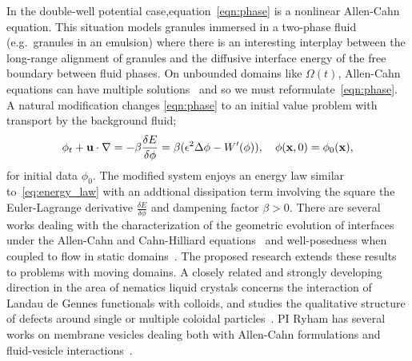 In the double-well potential case,equation~\eqref{eqn:phase} is a
nonlinear Allen-Cahn equation. This situation models granules immersed
in a two-phase fluid (e.g.~granules in an emulsion) where there is an
interesting interplay between the long-range alignment of granules and
the diffusive interface energy of the free boundary between fluid
phases. On unbounded domains like $\Omega(t)$, Allen-Cahn equations can
have multiple solutions~\cite{Alama1997StationaryLS,
Alikakos2008OnAE, Bronsard1993OnTB, Byeon2014SolutionsOH, Byeon2013OnAP,
Alessio2005ENTIRESI, Trumper2007ExistenceOA, Benci2019MultipleSF} and so
we must reformulate~\eqref{eqn:phase}. A natural modification changes
\eqref{eqn:phase} to an initial value problem with transport by the
background fluid;
\begin{align}
  \label{eqn:phase_transport}
  \phi_t + \mathbf{u} \cdot \nabla
  = -\beta \frac{\delta E}{\delta \phi}
  = \beta(\epsilon^2 \Delta \phi - W'(\phi)),
  \quad \phi(\mathbf{x},0) = \phi_0(\mathbf{x}),
\end{align}
for initial data $\phi_0$. The modified system enjoys an energy law
similar to~\eqref{eq:energy_law} with an addtional dissipation term
involving the square the Euler-Lagrange derivative $\frac{\delta
E}{\delta \phi}$ and dampening factor $\beta > 0$. There are several
works dealing with the characterization of the geometric evolution of
interfaces under the Allen-Cahn and Cahn-Hilliard
equations~\cite{Christlieb2019CompetitionAC, Gavish2011CurvatureDF,
Dai2019WeakSF, Promislow2017ExistenceBA, Dai2015CompetitiveGE,
Promislow2012CriticalPO, Dai2022GeometricEO, Dai2020MinimizersFT,
Dai2013GeometricEO, Promislow2022UndulatedBI} and well-posedness when
coupled to flow in static domains~\cite{Jiang2017TwophaseIF,
Liu2012StrongSF, Giorgini2019WellPosednessOA, Wu2022WellposednessOA,
Gal2010AsymptoticBO, Giorgini2020DiffuseIM, Giorgini2019UniquenessAR}.
The proposed research extends these results to problems with moving
domains. A closely related and strongly developing direction in the area
of nematics liquid crystals concerns the interaction of Landau de Gennes
functionals with colloids, and studies the qualitative structure of
defects around single or multiple coloidal
particles~\cite{doi:10.1098/rsta.2020.0432, Alama2015MinimizersOT,
Alama2021SaturnRD, PhysRevE.96.042702}. PI Ryham has several works on
membrane vesicles dealing both with Allen-Cahn formulations and
fluid-vesicle interactions~\cite{QiangDu09, RYHAM20112929, RyCoEi12,
Ryham2017OnTV}.

